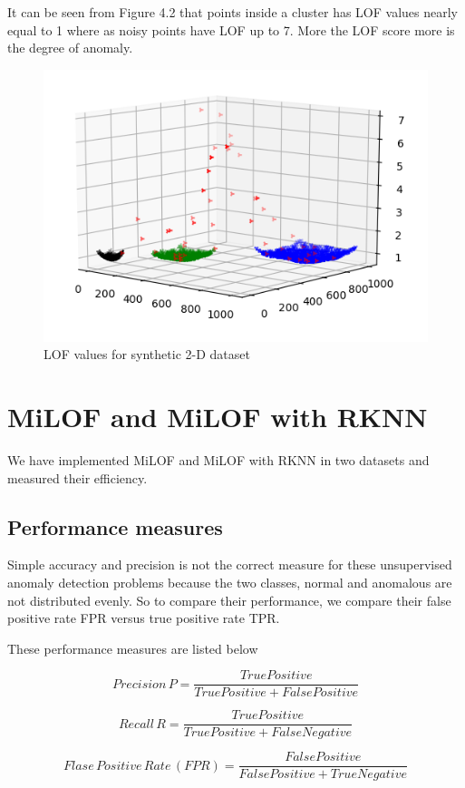It can be seen from Figure 4.2 that points inside a cluster has LOF values nearly equal to 1 where as noisy points have LOF up to 7. More the LOF score more is the degree of anomaly.

\begin{figure}[H]
	\centering
	\includegraphics{chap04/LOF_result.png}
	\caption{LOF values for synthetic 2-D dataset}
\end{figure}


\section{MiLOF and MiLOF with RKNN}

We have implemented MiLOF and MiLOF with RKNN in two datasets and measured their efficiency.

\subsection{Performance measures}
Simple accuracy and precision is not the correct measure for these unsupervised anomaly detection problems because the two classes, normal and anomalous are not distributed evenly. So to compare their performance, we compare their false positive rate FPR versus true positive rate TPR.

These performance measures are listed below


\[  Precision \, P = \frac{True Positive }{True Positive + False Positive} \]

 \[  Recall \,  R = \frac{True Positive }{True Positive + False Negative} \]

\[  Flase \, Positive \, Rate \,  (FPR) = \frac{False Positive }{False Positive + True Negative} \]
\\
\\
